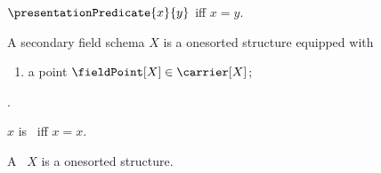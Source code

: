 \begin{definition}\label{presentation_predicate}
    $\presentationPredicate{x}{y}$ iff $x=y$.
\end{definition}

\begin{struct}\label{secondary_field_schema}
    A secondary field schema $X$ is a onesorted structure equipped with
    \begin{enumerate}
        \item\label{secondary_field_point}
            a point $\fieldPoint[X]\in\carrier[X]$;
    \end{enumerate}
    .
\end{struct}

\begin{definition}\label{presentation_adjective}
    $x$ is \presentationClass\ iff $x=x$.
\end{definition}

\begin{struct}\label{symbolic_schema}
    A \presentationSchema\ $X$ is a onesorted structure.
\end{struct}
